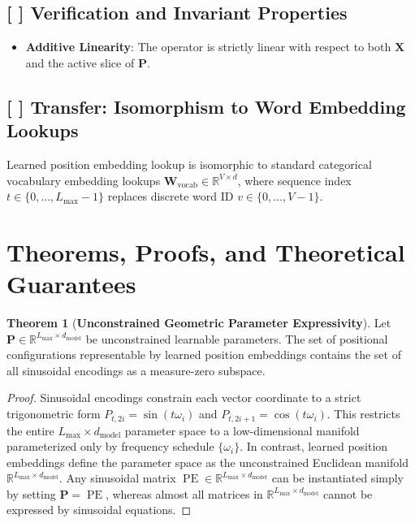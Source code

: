 \documentclass[11pt,a4paper]{article}
\theoremstyle{definition}
\newtheorem{theorem}{\textbf{Theorem}}[section]
\begin{document}
\subsection{[ ] Verification and Invariant Properties}
\begin{itemize}
    \item \textbf{Additive Linearity}: The operator is strictly linear with respect to both $\mathbf{X}$ and the active slice of $\mathbf{P}$.
\end{itemize}

\subsection{[ ] Transfer: Isomorphism to Word Embedding Lookups}
Learned position embedding lookup is isomorphic to standard categorical vocabulary embedding lookups $\mathbf{W}_{\text{vocab}} \in \mathbb{R}^{V \times d}$, where sequence index $t \in \{0, \dots, L_{\text{max}}-1\}$ replaces discrete word ID $v \in \{0, \dots, V-1\}$.

\section{Theorems, Proofs, and Theoretical Guarantees}

\begin{theorem}[\textbf{Unconstrained Geometric Parameter Expressivity}]
Let $\mathbf{P} \in \mathbb{R}^{L_{\text{max}} \times d_{\text{model}}}$ be unconstrained learnable parameters. The set of positional configurations representable by learned position embeddings contains the set of all sinusoidal encodings as a measure-zero subspace.
\end{theorem}

\begin{proof}
Sinusoidal encodings constrain each vector coordinate to a strict trigonometric form $P_{t, 2i} = \sin(t \omega_i)$ and $P_{t, 2i+1} = \cos(t \omega_i)$.
This restricts the entire $L_{\text{max}} \times d_{\text{model}}$ parameter space to a low-dimensional manifold parameterized only by frequency schedule $\{\omega_i\}$.
In contrast, learned position embeddings define the parameter space as the unconstrained Euclidean manifold $\mathbb{R}^{L_{\text{max}} \times d_{\text{model}}}$.
Any sinusoidal matrix $\operatorname{PE} \in \mathbb{R}^{L_{\text{max}} \times d_{\text{model}}}$ can be instantiated simply by setting $\mathbf{P} = \operatorname{PE}$, whereas almost all matrices in $\mathbb{R}^{L_{\text{max}} \times d_{\text{model}}}$ cannot be expressed by sinusoidal equations.
\end{proof}
\end{document}
